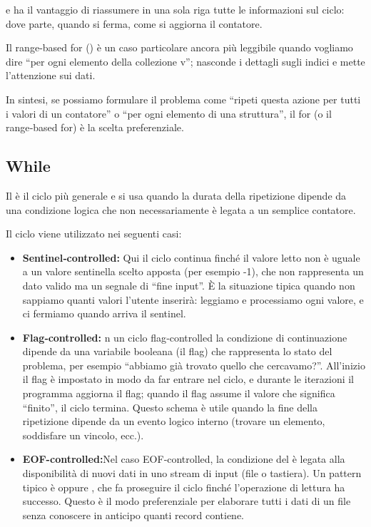e ha il vantaggio di riassumere in una sola riga tutte le informazioni sul ciclo: dove parte, quando si ferma, come si aggiorna il contatore.



Il range‑based for () è un caso particolare ancora più leggibile quando vogliamo dire “per ogni elemento della collezione v”; nasconde i dettagli sugli indici e mette l'attenzione sui dati.

In sintesi, se possiamo formulare il problema come “ripeti questa azione per tutti i valori di un contatore” o “per ogni elemento di una struttura”, il for (o il range‑based for) è la scelta preferenziale.





















\subsection{While}
Il  è il ciclo più generale e si usa quando la durata della ripetizione dipende da una condizione logica che non necessariamente è legata a un semplice contatore.

Il ciclo   viene utilizzato nei seguenti casi: 
\begin{itemize}
    \item \textbf{ Sentinel‑controlled:} Qui il ciclo continua finché il valore letto non è uguale a un valore sentinella scelto apposta (per esempio -1), che non rappresenta un dato valido ma un segnale di “fine input”. È la situazione tipica quando non sappiamo quanti valori l’utente inserirà: leggiamo e processiamo ogni valore, e ci fermiamo quando arriva il sentinel.
    \item \textbf{Flag‑controlled:} n un ciclo flag‑controlled la condizione di continuazione dipende da una variabile booleana (il flag) che rappresenta lo stato del problema, per esempio “abbiamo già trovato quello che cercavamo?”. All’inizio il flag è impostato in modo da far entrare nel ciclo, e durante le iterazioni il programma aggiorna il flag; quando il flag assume il valore che significa “finito”, il ciclo termina. Questo schema è utile quando la fine della ripetizione dipende da un evento logico interno (trovare un elemento, soddisfare un vincolo, ecc.).

    \item \textbf{EOF-controlled:}Nel caso EOF‑controlled, la condizione del  è legata alla disponibilità di nuovi dati in uno stream di input (file o tastiera). Un pattern tipico è  oppure , che fa proseguire il ciclo finché l’operazione di lettura ha successo. Questo è il modo preferenziale per elaborare tutti i dati di un file senza conoscere in anticipo quanti record contiene.
\end{itemize}



